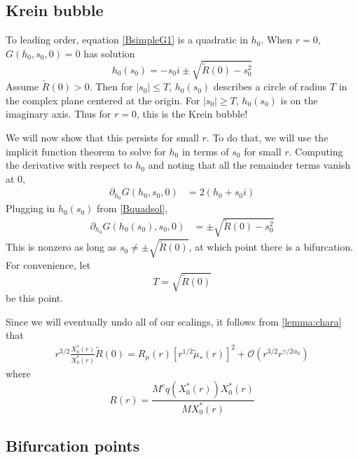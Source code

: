 \documentclass[thesis.tex]{subfiles}
\begin{document}
\subsection{Krein bubble}

To leading order, equation \cref{BsimpleG1} is a quadratic in $h_0$. When $r = 0$, $G(h_0, s_0, 0) = 0$ has solution
\begin{equation}\label{Bquadsol}
h_0(s_0) = -s_0 i \pm \sqrt{ \tilde{R}(0) - s_0^2 }
\end{equation}
Assume $\tilde{R}(0) > 0$. Then for $|s_0| \leq T$, $h_0(s_0)$ describes a circle of radius $T$ in the complex plane centered at the origin. For $|s_0| \geq T$, $h_0(s_0)$ is on the imaginary axis. Thus for $r = 0$, this is the Krein bubble!

We will now show that this persists for small $r$. To do that, we will use the implicit function theorem to solve for $h_0$ in terms of $s_0$ for small $r$. Computing the derivative with respect to $h_0$ and noting that all the remainder terms vanish at 0,
\begin{align*}
\partial_{h_0} G(h_0, s_0, 0) 
&= 2 ( h_0 + s_0 i)
\end{align*}
Plugging in $h_0(s_0)$ from \cref{Bquadsol},
\begin{align*}
\partial_{h_0} G(h_0(s_0), s_0, 0) 
&= \pm \sqrt{ \tilde{R}(0) - s_0^2 }
\end{align*}
This is nonzero as long as $s_0 \neq \pm \sqrt{\tilde{R}(0)}$, at which point there is a bifurcation. For convenience, let
\[
T = \sqrt{\tilde{R}(0)}
\]
be this point. 

Since we will eventually undo all of our scalings, it follows from \cref{lemma:chara} that
\begin{align}\label{undotildeR}
r^{3/2} \frac{X_0^*(r)}{X_0^*(r)}\tilde{R}(0) = R_\mu(r) [r^{1/2} \tilde{\mu}_*(r)]^2 + \mathcal{O}(r^{3/2}r^{\gamma/2 \alpha_0})
\end{align}
where
\begin{equation}\label{defRr}
R(r) = \frac{M^c q(X_0^*(r)) X_0^*(r)}{M X_0^*(r)}
\end{equation}

\subsection{Bifurcation points}
\end{document}
